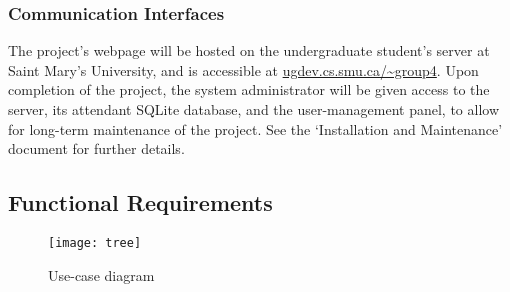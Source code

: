 \documentclass[11pt]{article}
\begin{document}
\subsubsection{Communication Interfaces}
The project's webpage will be hosted on the undergraduate student's server at Saint Mary's
University, and is accessible at \url{ugdev.cs.smu.ca/~group4}. Upon completion of the project, the
system administrator will be given access to the server, its attendant SQLite database, and the
user-management panel, to allow for long-term maintenance of the project. See the `Installation
and Maintenance' document for further details.

\subsection{Functional Requirements}

\begin{figure}[!htb]
  \centering
  \texttt{[image: tree]}
  \caption{Use-case diagram}
\end{figure}
\end{document}
